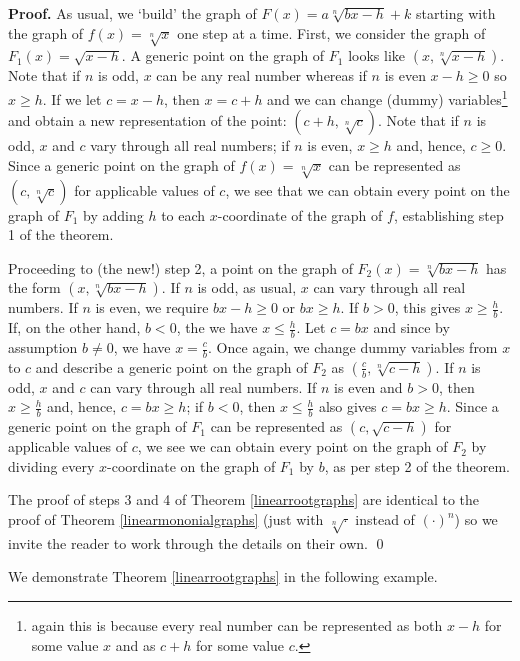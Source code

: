 \documentclass{ximera}
\begin{document}
 {\bf Proof.}  As usual, we `build' the graph of $F(x) = a \sqrt[n]{bx-h}+k$ starting with the graph of $f(x) = \sqrt[n]{x}$ one step at a time.  First, we consider the graph of $F_{1}(x) = \sqrt{x-h}$.  A generic point on the graph of $F_{1}$ looks like $(x, \sqrt[n]{x-h})$.  Note that if $n$ is odd, $x$ can be any real number whereas if $n$ is even $x-h \geq 0$ so $x \geq h$.   If we let $c = x-h$, then $x = c+h$ and we can change (dummy) variables\footnote{again this is because every real number can be represented as both $x-h$ for some value $x$ and as $c+h$  for some value $c$.} and obtain a new representation of the point: $(c+h, \sqrt[n]{c})$.  Note that if $n$ is odd, $x$ and $c$ vary through all real numbers;  if $n$ is even, $x \geq h$ and, hence,  $c \geq 0$.  Since a generic point on the graph of $f(x) = \sqrt[n]{x}$ can be represented as $(c, \sqrt[n]{c})$ for applicable values of $c$, we see that we can obtain every point on the graph of $F_{1}$ by adding $h$ to each $x$-coordinate of the graph of $f$, establishing step 1 of the theorem.  
 
Proceeding to (the new!) step 2, a point on the graph of $F_{2}(x) = \sqrt[n]{bx-h}$ has the form $(x, \sqrt[n]{bx-h})$.  If $n$ is odd, as usual, $x$ can vary through all real numbers.  If $n$ is even, we require $bx-h \geq 0$ or $bx \geq h$.  If $b>0$, this gives $x \geq \frac{h}{b}$.  If, on the other hand, $b<0$, the we have $x \leq \frac{h}{b}$.   Let  $c = bx$ and since by assumption $b \neq 0$, we have $x = \frac{c}{b}$. Once again, we change dummy variables from $x$ to $c$ and describe a generic point on the graph of $F_{2}$ as $\left( \frac{c}{b}, \sqrt[n]{c - h} \right)$.  If $n$ is odd, $x$ and $c$ can vary through all real numbers.  If $n$ is even and $b>0$, then $x \geq \frac{h}{b}$ and, hence, $c = bx \geq h$;  if $b<0$, then $x \leq \frac{h}{b}$ also gives $c = bx \geq h$.  Since a generic point on the graph of $F_{1}$ can be represented as $(c, \sqrt{c-h})$ for applicable values of $c$, we see we can obtain every point on the graph of $F_{2}$ by dividing every $x$-coordinate on the graph of $F_{1}$ by $b$, as per step 2 of the theorem.

The proof of steps 3 and 4 of Theorem \ref{linearrootgraphs} are identical to the proof of  Theorem \ref{linearmononialgraphs} (just with $\sqrt[n]{\cdot}$ instead of $( \cdot )^n$) so we invite the reader to work through the details on their own.  \qed

We  demonstrate Theorem \ref{linearrootgraphs} in the following example.
\end{document}
